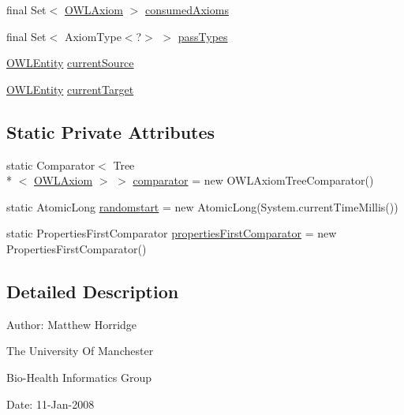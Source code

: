 \begin{DoxyCompactItemize}
\item 
final Set$<$ \hyperlink{interfaceorg_1_1semanticweb_1_1owlapi_1_1model_1_1_o_w_l_axiom}{O\-W\-L\-Axiom} $>$ \hyperlink{classuk_1_1ac_1_1manchester_1_1cs_1_1owl_1_1explanation_1_1ordering_1_1_explanation_orderer_impl_aa4c9b2b9fcb307b4aca00f16e71ddd2b}{consumed\-Axioms}
\item 
final Set$<$ Axiom\-Type$<$?$>$ $>$ \hyperlink{classuk_1_1ac_1_1manchester_1_1cs_1_1owl_1_1explanation_1_1ordering_1_1_explanation_orderer_impl_ae1c41bfcdb01a5d2e48adec3612c2a4e}{pass\-Types}
\item 
\hyperlink{interfaceorg_1_1semanticweb_1_1owlapi_1_1model_1_1_o_w_l_entity}{O\-W\-L\-Entity} \hyperlink{classuk_1_1ac_1_1manchester_1_1cs_1_1owl_1_1explanation_1_1ordering_1_1_explanation_orderer_impl_aa2fb21f559b3871a5a647a798abc3771}{current\-Source}
\item 
\hyperlink{interfaceorg_1_1semanticweb_1_1owlapi_1_1model_1_1_o_w_l_entity}{O\-W\-L\-Entity} \hyperlink{classuk_1_1ac_1_1manchester_1_1cs_1_1owl_1_1explanation_1_1ordering_1_1_explanation_orderer_impl_a97d9298f9ac6dd4692c71d389c5fd3ac}{current\-Target}
\end{DoxyCompactItemize}
\subsection*{Static Private Attributes}
\begin{DoxyCompactItemize}
\item 
static Comparator$<$ Tree\\*
$<$ \hyperlink{interfaceorg_1_1semanticweb_1_1owlapi_1_1model_1_1_o_w_l_axiom}{O\-W\-L\-Axiom} $>$ $>$ \hyperlink{classuk_1_1ac_1_1manchester_1_1cs_1_1owl_1_1explanation_1_1ordering_1_1_explanation_orderer_impl_ade5175f3f478af965367a825d2688313}{comparator} = new O\-W\-L\-Axiom\-Tree\-Comparator()
\item 
static Atomic\-Long \hyperlink{classuk_1_1ac_1_1manchester_1_1cs_1_1owl_1_1explanation_1_1ordering_1_1_explanation_orderer_impl_a14a20bc03b84b7431e38e518c862b92f}{randomstart} = new Atomic\-Long(System.\-current\-Time\-Millis())
\item 
static Properties\-First\-Comparator \hyperlink{classuk_1_1ac_1_1manchester_1_1cs_1_1owl_1_1explanation_1_1ordering_1_1_explanation_orderer_impl_af6203b221e1aadc6bbf0c31abb1d4d51}{properties\-First\-Comparator} = new Properties\-First\-Comparator()
\end{DoxyCompactItemize}


\subsection{Detailed Description}
Author\-: Matthew Horridge\par
 The University Of Manchester\par
 Bio-\/\-Health Informatics Group\par
 Date\-: 11-\/\-Jan-\/2008\par
 \par
 

